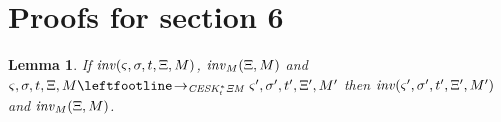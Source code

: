 \documentclass{article}
\newtheorem{lemma}{Lemma}
\begin{document}
\section{Proofs for section 6}
\begin{lemma}
  If $\mathit{inv}(\varsigma,\sigma,t,\Xi,M)$, $\mathit{inv}_M(\Xi,M)$ and
  $\mstate,\mstore,\mtime,\mktab,\mmemo \stepto_{\CESKKMstart} \mstate',\mstore',\mtime',\mktab',\mmemo'$
  then $\mathit{inv}(\varsigma',\sigma',t',\Xi',M')$ and $\mathit{inv}_M(\Xi,M)$.
\end{lemma}

\end{document}
